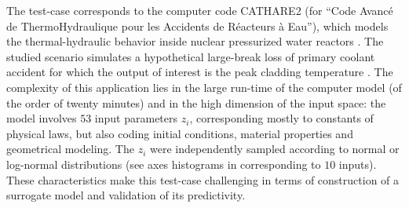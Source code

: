 The test-case corresponds to the computer code CATHARE2 (for ``Code Avanc\'e de ThermoHydraulique pour les Accidents de R\'eacteurs \`a Eau''), which models the thermal-hydraulic behavior inside nuclear pressurized water reactors \cite{gefant11}. 
The studied scenario simulates a hypothetical large-break loss of primary coolant accident for which the output of interest is the peak cladding temperature \cite{decbaz08,ioobou10}. 
The complexity of this application lies in the large run-time of the computer model (of the order of twenty minutes) and in the high dimension of the input space: the model involves $53$ input parameters $z_i$, corresponding mostly to constants of physical laws, but also coding initial conditions, material properties and geometrical modeling. 
The $z_i$ were independently sampled according to normal or log-normal distributions (see axes histograms in  corresponding to $10$ inputs). 
These characteristics make this test-case challenging in terms of construction of a surrogate model and validation of its predictivity.


